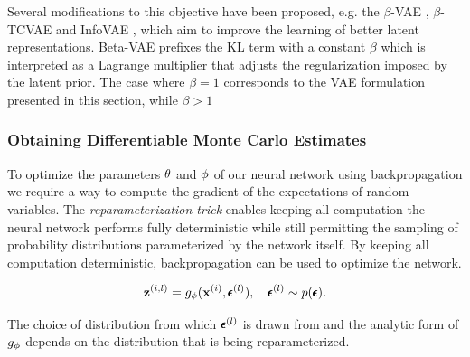 Several modifications to this objective have been proposed, e.g. the $\beta$-VAE \cite{beta_vae, understanding_beta_vae}, $\beta$-TCVAE \cite{beta_tcvae} and InfoVAE \cite{infovae}, which aim to improve the learning of better latent representations. Beta-VAE prefixes the KL term with a constant $\beta$ which is interpreted as a Lagrange multiplier that adjusts the regularization imposed by the latent prior. The case where $\beta = 1$ corresponds to the VAE formulation presented in this section, while $\beta > 1$ 

\subsubsection{Obtaining Differentiable Monte Carlo Estimates}

To optimize the parameters $\theta$ and $\phi$ of our neural network using backpropagation we require a way to compute the gradient of the expectations of random variables. The \textit{reparameterization trick} enables keeping all computation the neural network performs fully deterministic while still permitting the sampling of probability distributions parameterized by the network itself. By keeping all computation deterministic, backpropagation can be used to optimize the network.


$$\mathbf{z}^{(i,l)} = g_{\phi}(\mathbf{x}^{(i)}, \pmb{\epsilon}^{(l)}), \quad \pmb{\epsilon}^{(l)} \sim p(\pmb{\epsilon}).$$

The choice of distribution from which $\pmb{\epsilon}^{(l)}$ is drawn from and the analytic form of $g_{\phi}$ depends on the distribution that is being reparameterized. 

